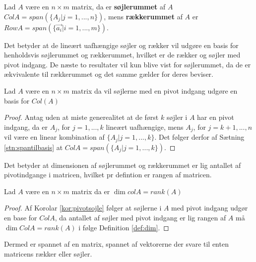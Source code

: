 \begin{defn}
Lad $A$ være en $n\times m$ matrix, da er \textbf{søjlerummet} af $A$ $Col A = span(\{A_j | j =1,...,n\})$, mens \textbf{rækkerummet} af $A$ er $Row A = span(\{\vec{a_i}|i=1,...,m\})$.
\label{def:sojlerum}
\end{defn} 
Det betyder at de lineært uafhængige søjler og rækker vil udgøre en basis for henholdsvis søjlerummet og rækkerummet, hvilket er de rækker og søjler med pivot indgang. 
De næste to resultater vil kun blive vist for søjlerummet, da de er ækvivalente til rækkerummet og det samme gælder for deres beviser.
\begin{kor}
Lad $A$ være en $n \times m$ matrix da vil søjlerne med en pivot indgang udgøre en basis for $Col (A)$
\label{kor:pivotsojle}
\end{kor}
\begin{proof}
Antag uden at miste generealitet at de først $k$ søjler i $A$ har en pivot indgang, da er $A_j$, for $j=1,...,k$ lineært uafhængige, mens $A_j$, for $j = k+1,...,n$ vil være en linear kombination af $\{A_j | j = 1,...,k\}$. 
Det følger derfor af Sætning \ref{stn:spantilbasis} at $Col A = span(\{A_j| j=1,...,k\})$.
\end{proof}
Det betyder at dimensionen af søjlerummet og rækkerummet er lig antallet af pivotindgange i matricen, hvilket pr defintion er rangen af matricen.
\begin{kor}
Lad $A$ være en $n\times m $ matrix da er $\dim{col A} = rank (A)$
\end{kor}
\begin{proof}
Af Korolar \ref{kor:pivotsojle} følger at søjlerne i $A$ med pivot indgang udgør en base for $Col A$, da antallet af søjler med pivot indgang er lig rangen af $A$ må $\dim{Col A} = rank (A)$ i følge Definition \ref{def:dim}.
\end{proof}
Dermed er spannet af en matrix, spannet af vektorerne der svare til enten matricens rækker eller søjler.
